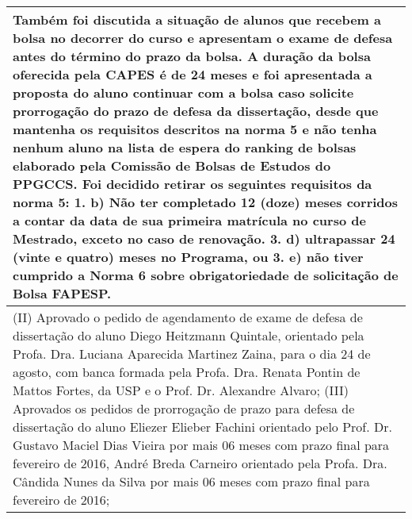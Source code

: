 \begin{longtable}{|p{17.5cm}|}
 \\ \hline 
Também foi discutida a situação de alunos que recebem a bolsa no decorrer do curso e apresentam o exame de defesa antes do término do prazo da bolsa. A duração da bolsa oferecida pela CAPES é de 24 meses e foi apresentada a proposta do aluno continuar com a bolsa caso solicite prorrogação do prazo de defesa da dissertação, desde que mantenha os requisitos descritos na norma 5 e não tenha nenhum aluno na lista de espera do ranking de bolsas elaborado pela Comissão de Bolsas de Estudos do PPGCCS. Foi decidido retirar os seguintes requisitos da norma 5: 1. b) Não ter completado 12 (doze) meses corridos a contar da data de sua primeira matrícula no curso de Mestrado, exceto no caso de renovação. 3. d) ultrapassar 24 (vinte e quatro) meses no Programa, ou 3. e) não tiver cumprido a Norma 6 sobre obrigatoriedade de solicitação de Bolsa FAPESP.

 \\ \hline 
(II) Aprovado o pedido de agendamento de exame de defesa de dissertação do aluno Diego Heitzmann Quintale, orientado pela Profa. Dra. Luciana Aparecida Martinez Zaina, para o dia 24 de agosto, com banca formada pela Profa. Dra. Renata Pontin de Mattos Fortes, da USP e o Prof. Dr. Alexandre Alvaro; (III) Aprovados os pedidos de prorrogação de prazo para defesa de dissertação do aluno Eliezer Elieber Fachini orientado pelo Prof. Dr. Gustavo Maciel Dias Vieira por mais 06 meses com prazo final para fevereiro de 2016, André Breda Carneiro orientado pela Profa. Dra. Cândida Nunes da Silva por mais 06 meses com prazo final para fevereiro de 2016;

 \\ \hline 

\end{longtable} 



